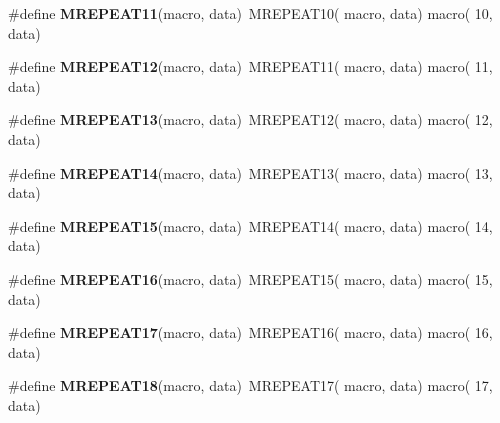 \begin{DoxyCompactItemize}
\item 
\hypertarget{group__group__xmega__utils__mrepeat_gabd366a56c6734a5ce3ff89dc84760244}{\#define {\bfseries M\-R\-E\-P\-E\-A\-T11}(macro, data)~M\-R\-E\-P\-E\-A\-T10( macro, data)   macro( 10, data)}\label{group__group__xmega__utils__mrepeat_gabd366a56c6734a5ce3ff89dc84760244}

\item 
\hypertarget{group__group__xmega__utils__mrepeat_ga5e8405725939e1548f4c09088bb9284a}{\#define {\bfseries M\-R\-E\-P\-E\-A\-T12}(macro, data)~M\-R\-E\-P\-E\-A\-T11( macro, data)   macro( 11, data)}\label{group__group__xmega__utils__mrepeat_ga5e8405725939e1548f4c09088bb9284a}

\item 
\hypertarget{group__group__xmega__utils__mrepeat_ga235cc5c4e4fb84c9d44ee4b5b5b4a7d1}{\#define {\bfseries M\-R\-E\-P\-E\-A\-T13}(macro, data)~M\-R\-E\-P\-E\-A\-T12( macro, data)   macro( 12, data)}\label{group__group__xmega__utils__mrepeat_ga235cc5c4e4fb84c9d44ee4b5b5b4a7d1}

\item 
\hypertarget{group__group__xmega__utils__mrepeat_gab75712b9509bac034c07db02ea0e0485}{\#define {\bfseries M\-R\-E\-P\-E\-A\-T14}(macro, data)~M\-R\-E\-P\-E\-A\-T13( macro, data)   macro( 13, data)}\label{group__group__xmega__utils__mrepeat_gab75712b9509bac034c07db02ea0e0485}

\item 
\hypertarget{group__group__xmega__utils__mrepeat_gaa3c5de4c7a937ef2f00049285ed41a0a}{\#define {\bfseries M\-R\-E\-P\-E\-A\-T15}(macro, data)~M\-R\-E\-P\-E\-A\-T14( macro, data)   macro( 14, data)}\label{group__group__xmega__utils__mrepeat_gaa3c5de4c7a937ef2f00049285ed41a0a}

\item 
\hypertarget{group__group__xmega__utils__mrepeat_gaf3c066d33ccd6fd8378495955121baae}{\#define {\bfseries M\-R\-E\-P\-E\-A\-T16}(macro, data)~M\-R\-E\-P\-E\-A\-T15( macro, data)   macro( 15, data)}\label{group__group__xmega__utils__mrepeat_gaf3c066d33ccd6fd8378495955121baae}

\item 
\hypertarget{group__group__xmega__utils__mrepeat_gaff45aee56d734a3bdf90cdd86b5693d9}{\#define {\bfseries M\-R\-E\-P\-E\-A\-T17}(macro, data)~M\-R\-E\-P\-E\-A\-T16( macro, data)   macro( 16, data)}\label{group__group__xmega__utils__mrepeat_gaff45aee56d734a3bdf90cdd86b5693d9}

\item 
\hypertarget{group__group__xmega__utils__mrepeat_gaeac781e6017f799e59bfc8d46e5cc9a1}{\#define {\bfseries M\-R\-E\-P\-E\-A\-T18}(macro, data)~M\-R\-E\-P\-E\-A\-T17( macro, data)   macro( 17, data)}\label{group__group__xmega__utils__mrepeat_gaeac781e6017f799e59bfc8d46e5cc9a1}


\end{DoxyCompactItemize}
